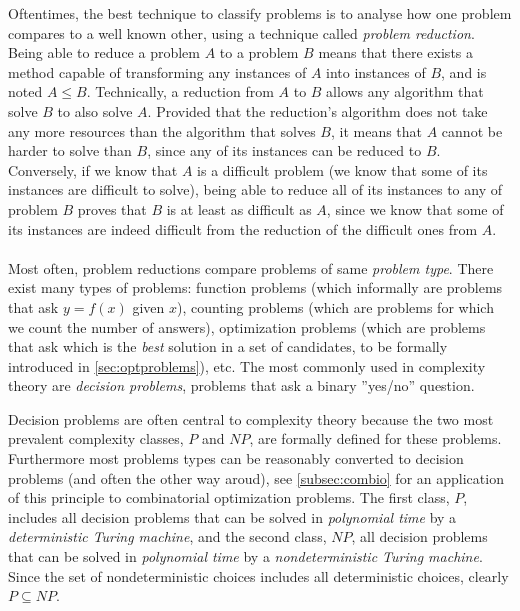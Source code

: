 	Oftentimes, the best technique to classify problems is to analyse how one problem compares to a well known other, using a technique called \emph{problem reduction}.
	Being able to reduce a problem $A$ to a problem $B$ means that there exists a method capable of transforming any instances of $A$ into instances of $B$, and is noted $A \leq B$.
	Technically, a reduction from $A$ to $B$ allows any algorithm that solve $B$ to also solve $A$.
	Provided that the reduction's algorithm does not take any more resources than the algorithm that solves $B$, it means that $A$ cannot be harder to solve than $B$, since any of its instances can be reduced to $B$.
	Conversely, if we know that $A$ is a difficult problem (we know that some of its instances are difficult to solve), being able to reduce all of its instances to any of problem $B$ proves that $B$ is at least as difficult as $A$, since we know that some of its instances are indeed difficult from the reduction of the difficult ones from $A$.

	\paragraph{}
	Most often, problem reductions compare problems of same \emph{problem type}.
	There exist many types of problems: function problems (which informally are problems that ask $y = f(x)$ given $x$), counting problems (which are problems for which we count the number of answers), optimization problems (which are problems that ask which is the \emph{best} solution in a set of candidates, to be formally introduced in \cref{sec:optproblems}), etc.
	The most commonly used in complexity theory are \emph{decision problems}, problems that ask a binary ''yes/no'' question.

	Decision problems are often central to complexity theory because the two most prevalent complexity classes, $P$ and $NP$, are formally defined for these problems.
	Furthermore most problems types can be reasonably converted to decision problems (and often the other way aroud), see \cref{subsec:combio} for an application of this principle to combinatorial optimization problems.
	The first class, $P$, includes all decision problems that can be solved in \emph{polynomial time} by a \emph{deterministic Turing machine}, and the second class, $NP$, all decision problems that can be solved in \emph{polynomial time} by a \emph{nondeterministic Turing machine}.
	Since the set of nondeterministic choices includes all deterministic choices, clearly $P \subseteq NP$.


